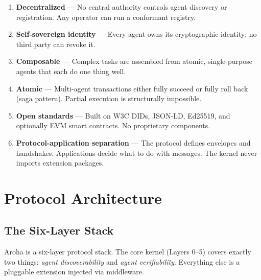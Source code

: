 \documentclass[11pt,a4paper]{article}
\begin{document}
\begin{enumerate}[leftmargin=*, label=\textbf{\arabic*.}]
  \item \textbf{Decentralized} --- No central authority controls agent discovery or
        registration. Any operator can run a conformant registry.
  \item \textbf{Self-sovereign identity} --- Every agent owns its cryptographic
        identity; no third party can revoke it.
  \item \textbf{Composable} --- Complex tasks are assembled from atomic,
        single-purpose agents that each do one thing well.
  \item \textbf{Atomic} --- Multi-agent transactions either fully succeed or fully
        roll back (saga pattern). Partial execution is structurally impossible.
  \item \textbf{Open standards} --- Built on W3C DIDs, JSON-LD, Ed25519, and
        optionally EVM smart contracts. No proprietary components.
  \item \textbf{Protocol-application separation} --- The protocol defines envelopes
        and handshakes. Applications decide what to do with messages. The kernel
        never imports extension packages.
\end{enumerate}

\section{Protocol Architecture}

\subsection{The Six-Layer Stack}

Aroha is a six-layer protocol stack. The core kernel (Layers 0--5) covers exactly
two things: \textit{agent discoverability} and \textit{agent verifiability}.
Everything else is a pluggable extension injected via middleware.
\end{document}
